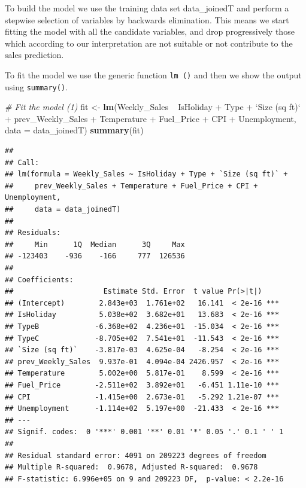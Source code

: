\documentclass[11pt,]{article}
\newenvironment{Shaded}{\begin{snugshade}}{\end{snugshade}}
\newcommand{\KeywordTok}[1]{\textcolor[rgb]{0.13,0.29,0.53}{\textbf{{#1}}}}
\newcommand{\DataTypeTok}[1]{\textcolor[rgb]{0.13,0.29,0.53}{{#1}}}
\newcommand{\StringTok}[1]{\textcolor[rgb]{0.31,0.60,0.02}{{#1}}}
\newcommand{\CommentTok}[1]{\textcolor[rgb]{0.56,0.35,0.01}{\textit{{#1}}}}
\newcommand{\NormalTok}[1]{{#1}}
\begin{document}
To build the model we use the training data set data\_joinedT and
perform a stepwise selection of variables by backwards elimination. This
means we start fitting the model with all the candidate variables, and
drop progressively those which according to our interpretation are not
suitable or not contribute to the sales prediction.

To fit the model we use the generic function \texttt{lm\ ()} and then we
show the output using \texttt{summary()}.

\begin{Shaded}
\begin{Highlighting}[]
\CommentTok{# Fit the model (1)}
\NormalTok{fit <-}\StringTok{ }\KeywordTok{lm}\NormalTok{(Weekly_Sales ~}\StringTok{ }\NormalTok{IsHoliday +}\StringTok{ }\NormalTok{Type +}\StringTok{ `}\DataTypeTok{Size (sq ft)}\StringTok{`} \NormalTok{+}\StringTok{ }
\StringTok{    }\NormalTok{prev_Weekly_Sales +}\StringTok{ }\NormalTok{Temperature +}\StringTok{ }\NormalTok{Fuel_Price +}\StringTok{ }\NormalTok{CPI +}\StringTok{ }\NormalTok{Unemployment, }
    \DataTypeTok{data =} \NormalTok{data_joinedT)}
\KeywordTok{summary}\NormalTok{(fit)}
\end{Highlighting}
\end{Shaded}

\begin{verbatim}
## 
## Call:
## lm(formula = Weekly_Sales ~ IsHoliday + Type + `Size (sq ft)` + 
##     prev_Weekly_Sales + Temperature + Fuel_Price + CPI + Unemployment, 
##     data = data_joinedT)
## 
## Residuals:
##     Min      1Q  Median      3Q     Max 
## -123403    -936    -166     777  126536 
## 
## Coefficients:
##                     Estimate Std. Error  t value Pr(>|t|)    
## (Intercept)        2.843e+03  1.761e+02   16.141  < 2e-16 ***
## IsHoliday          5.038e+02  3.682e+01   13.683  < 2e-16 ***
## TypeB             -6.368e+02  4.236e+01  -15.034  < 2e-16 ***
## TypeC             -8.705e+02  7.541e+01  -11.543  < 2e-16 ***
## `Size (sq ft)`    -3.817e-03  4.625e-04   -8.254  < 2e-16 ***
## prev_Weekly_Sales  9.937e-01  4.094e-04 2426.957  < 2e-16 ***
## Temperature        5.002e+00  5.817e-01    8.599  < 2e-16 ***
## Fuel_Price        -2.511e+02  3.892e+01   -6.451 1.11e-10 ***
## CPI               -1.415e+00  2.673e-01   -5.292 1.21e-07 ***
## Unemployment      -1.114e+02  5.197e+00  -21.433  < 2e-16 ***
## ---
## Signif. codes:  0 '***' 0.001 '**' 0.01 '*' 0.05 '.' 0.1 ' ' 1
## 
## Residual standard error: 4091 on 209223 degrees of freedom
## Multiple R-squared:  0.9678, Adjusted R-squared:  0.9678 
## F-statistic: 6.996e+05 on 9 and 209223 DF,  p-value: < 2.2e-16
\end{verbatim}
\end{document}
